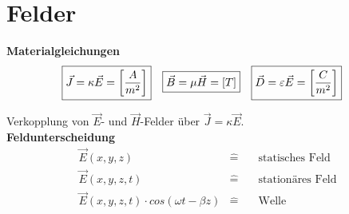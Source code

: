 \section{Felder}
\textbf{Materialgleichungen}
\begin{align*}
    \Aboxed{\vec{J}  = \kappa\vec{E} = \left[\dfrac{A}{m^2}\right]} &
    \Aboxed{\vec{B}  = \mu\vec{H} = [T]}    &
    \Aboxed{\vec{D}  = \varepsilon\vec{E} = \left[\dfrac{C}{m^2}\right]}
\end{align*}

Verkopplung von $ \vec{E}$- und $ \vec{H}$-Felder über $ \vec{J}=\kappa\vec{E}$.\\

\textbf{Feldunterscheidung}
\begin{align*}
     & \vec{E}(x,y,z)                               & \widehat= & \quad\text{statisches Feld}  & \\
     & \vec{E}(x,y,z,t)                             & \widehat= & \quad\text{stationäres Feld} & \\
     & \vec{E}(x,y,z,t)\cdot cos(\omega t -\beta z) & \widehat= & \quad\text{Welle}            &
\end{align*}


